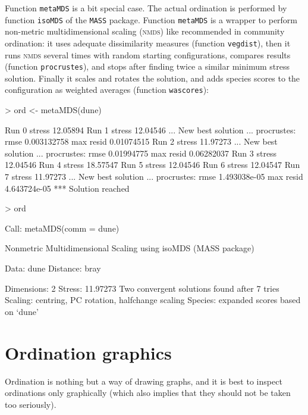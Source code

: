 \documentclass[a4paper,10pt]{amsart}
\begin{document}
Function \texttt{metaMDS} is a bit special case.  The actual
ordination is performed by function \texttt{isoMDS} of the \texttt{MASS}
package.  Function \texttt{metaMDS} is a wrapper to perform non-metric
multidimensional scaling (\textsc{nmds}) like recommended in community
ordination: it uses adequate dissimilarity measures (function
\texttt{vegdist}), then it runs \textsc{nmds} several times with
random starting configurations, compares results (function
\texttt{procrustes}), and stops after finding twice a similar minimum stress
solution.  Finally it scales and rotates the solution, and adds
species scores to the configuration as weighted averages (function
\texttt{wascores}):
\begin{Schunk}
\begin{Sinput}
> ord <- metaMDS(dune)
\end{Sinput}
\begin{Soutput}
Run 0 stress 12.05894 
Run 1 stress 12.04546 
... New best solution
... procrustes: rmse 0.003132758  max resid 0.01074515 
Run 2 stress 11.97273 
... New best solution
... procrustes: rmse 0.01994775  max resid 0.06282037 
Run 3 stress 12.04546 
Run 4 stress 18.57547 
Run 5 stress 12.04546 
Run 6 stress 12.04547 
Run 7 stress 11.97273 
... New best solution
... procrustes: rmse 1.493038e-05  max resid 4.643724e-05 
*** Solution reached
\end{Soutput}
\begin{Sinput}
> ord
\end{Sinput}
\begin{Soutput}
Call:
metaMDS(comm = dune) 

Nonmetric Multidimensional Scaling using isoMDS (MASS package)

Data:     dune 
Distance: bray 

Dimensions: 2 
Stress:     11.97273 
Two convergent solutions found after 7 tries
Scaling: centring, PC rotation, halfchange scaling 
Species: expanded scores based on ‘dune’ 
\end{Soutput}
\end{Schunk}

\section{Ordination graphics}

Ordination is nothing but a way of drawing graphs, and it is best to
inspect ordinations only graphically (which also implies that they
should not be taken too seriously).
\end{document}
